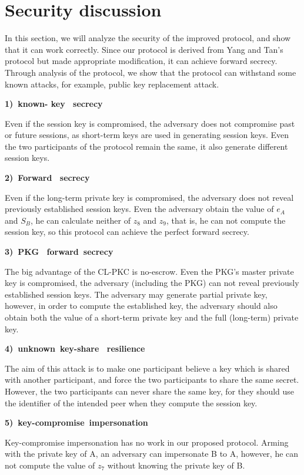 \documentclass[final,1p,times,twocolumn]{elsarticle}
\begin{document}
\section{Security discussion}

\label{5}


In this section, we will analyze the security of the improved protocol, and show that it can work correctly. Since our protocol is derived from Yang and Tan's protocol but made appropriate modification, it can achieve forward secrecy. Through analysis of the protocol, we show that the protocol can withstand some known attacks, for example, public key replacement attack.

 {\bf 1)\  known- key \ secrecy}

Even if the session key is compromised, the adversary does not compromise past or future sessions, as short-term keys are used in generating session keys. Even the two participants  of the protocol remain the same, it also generate different session keys.

{\bf 2)\  Forward \ secrecy}

Even if the long-term private key is compromised, the adversary does not reveal previously established session keys. Even the adversary obtain  the value of $e_{A}$ and $S_{B}$, he can calculate neither of $z_{8}$ and $z_{9}$, that is, he can not compute the session key, so this protocol can achieve the perfect forward secrecy.

{\bf 3)\  PKG \ forward\  secrecy}

The big advantage of the CL-PKC is no-escrow. Even the PKG's master private key is compromised, the adversary (including the PKG) can not reveal previously established session keys. The adversary may generate partial private key, however, in order to compute the established key, the adversary should also obtain both the value of a short-term private key and the full (long-term) private key.

{\bf 4)\  unknown\  key-share \ resilience}

The aim of this attack is to make one participant believe a key which is shared with another participant, and force the two participants to share the same secret. However, the two participants can never share the same key, for they should use the identifier of the intended peer when they compute the session key.


{\bf 5)\  key-compromise\  impersonation}

Key-compromise impersonation has no work in our proposed protocol. Arming with the private key of A, an adversary can impersonate B to A, however, he can not compute the value of $z_{7}$ without knowing the private key of B.
\end{document}

